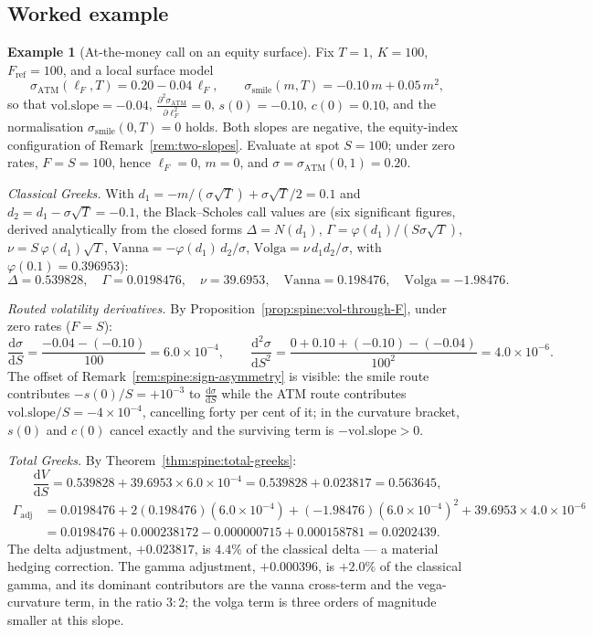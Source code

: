 \documentclass[11pt]{book}
\theoremstyle{plain}
\theoremstyle{definition}
\newtheorem{example}[theorem]{Example}
\theoremstyle{remark}
\newcommand{\mln}{m}                             %
\newcommand{\lF}{\ell_F}                         %
\newcommand{\Fref}{F_{\mathrm{ref}}}             %
\newcommand{\ssm}{\sigma_{\mathrm{smile}}}       %
\newcommand{\satm}{\sigma_{\mathrm{ATM}}}        %
\newcommand{\volslope}{\mathrm{vol.slope}}       %
\newcommand{\npdf}{\varphi}                      %
\newcommand{\ncdf}{N}                            %
\newcommand{\vega}{\nu}                          %
\newcommand{\Vanna}{\mathrm{Vanna}}
\newcommand{\Volga}{\mathrm{Volga}}
\newcommand{\Gadj}{\Gamma_{\mathrm{adj}}}        %
\newcommand{\dd}{\mathrm{d}}                                  %
\newcommand{\pdd}[2]{\frac{\partial^2 #1}{\partial #2^2}}     %
\newcommand{\td}[2]{\frac{\dd #1}{\dd #2}}                    %
\begin{document}
\subsection{Worked example}\label{sec:spine:worked}

\begin{example}[At-the-money call on an equity surface]\label{ex:spine:worked}
Fix $T = 1$, $K = 100$, $\Fref = 100$, and a local surface model
\begin{equation}\label{eq:spine:example-surface}
  \satm(\lF, T) = 0.20 - 0.04\,\lF,
  \qquad
  \ssm(\mln, T) = -0.10\,\mln + 0.05\,\mln^2,
\end{equation}
so that $\volslope = -0.04$, $\pdd{\satm}{\lF} = 0$, $s(0) = -0.10$,
$c(0) = 0.10$, and the normalisation $\ssm(0,T) = 0$ holds. Both slopes are
negative, the equity-index configuration of Remark~\ref{rem:two-slopes}.
Evaluate at spot $S = 100$; under
zero rates, $F = S = 100$, hence $\lF = 0$, $\mln = 0$, and
$\sigma = \satm(0,1) = 0.20$.

\emph{Classical Greeks.} With
$d_1 = -\mln/(\sigma\sqrt{T}) + \sigma\sqrt{T}/2 = 0.1$ and
$d_2 = d_1 - \sigma\sqrt{T} = -0.1$, the Black--Scholes call values are
(six significant figures, derived analytically from the closed forms
$\Delta = \ncdf(d_1)$, $\Gamma = \npdf(d_1)/(S\sigma\sqrt{T})$,
$\vega = S\,\npdf(d_1)\sqrt{T}$, $\Vanna = -\npdf(d_1)\,d_2/\sigma$,
$\Volga = \vega\, d_1 d_2/\sigma$, with $\npdf(0.1) = 0.396953$):
\[
  \Delta = 0.539828, \quad
  \Gamma = 0.0198476, \quad
  \vega = 39.6953, \quad
  \Vanna = 0.198476, \quad
  \Volga = -1.98476.
\]

\emph{Routed volatility derivatives.} By
Proposition~\ref{prop:spine:vol-through-F}, under zero rates ($F = S$):
\[
  \td{\sigma}{S} = \frac{-0.04 - (-0.10)}{100} = 6.0 \times 10^{-4},
  \qquad
  \frac{\dd^2 \sigma}{\dd S^2}
  = \frac{0 + 0.10 + (-0.10) - (-0.04)}{100^2} = 4.0 \times 10^{-6}.
\]
The offset of Remark~\ref{rem:spine:sign-asymmetry} is visible: the smile
route contributes $-s(0)/S = +10^{-3}$ to $\td{\sigma}{S}$ while the ATM route
contributes $\volslope/S = -4 \times 10^{-4}$, cancelling forty per cent of
it; in the curvature bracket, $s(0)$ and $c(0)$ cancel exactly and the
surviving term is $-\volslope > 0$.

\emph{Total Greeks.} By Theorem~\ref{thm:spine:total-greeks}:
\[
  \td{V}{S} = 0.539828 + 39.6953 \times 6.0\times10^{-4}
            = 0.539828 + 0.023817 = 0.563645,
\]
\begin{align*}
  \Gadj &= 0.0198476
        + 2(0.198476)(6.0\times10^{-4})
        + (-1.98476)(6.0\times10^{-4})^2
        + 39.6953 \times 4.0\times10^{-6} \\
        &= 0.0198476 + 0.000238172 - 0.000000715 + 0.000158781
        = 0.0202439.
\end{align*}
The delta adjustment, $+0.023817$, is $4.4\%$ of the classical delta --- a
material hedging correction. The gamma adjustment, $+0.000396$, is $+2.0\%$ of
the classical gamma, and its dominant contributors are the vanna cross-term
and the vega-curvature term, in the ratio $3:2$; the volga term is three
orders of magnitude smaller at this slope.


\end{example}
\end{document}
